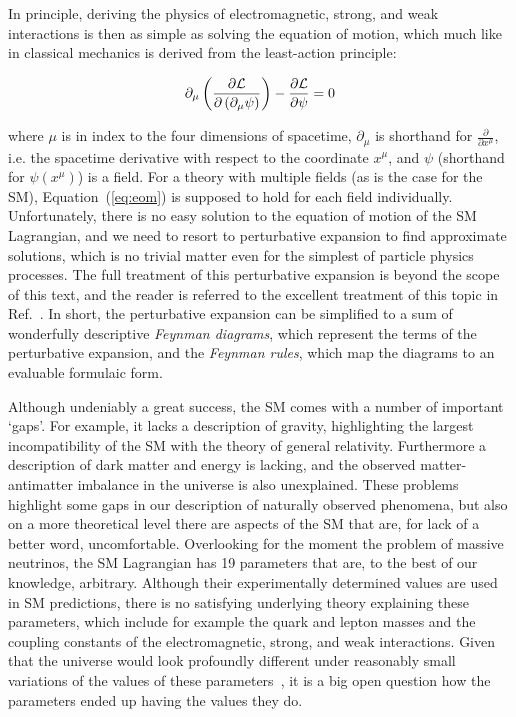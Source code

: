 In principle, deriving the physics of electromagnetic, strong, and weak interactions is then as simple as solving the equation of motion, which much like in classical mechanics is derived from the least-action principle:
% 
\begin{linenomath*}
\begin{equation}
\label{eq:eom}
\partial_\mu \left(
    \frac{
        \partial \mathcal{L}
        }{
        \partial \left( \partial_\mu \psi \right)
        }
    \right)
    -
    \frac{\partial\mathcal{L}}{\partial\psi}
    = 0
\end{equation}
\end{linenomath*}
% 
where $\mu$ is in index to the four dimensions of spacetime, $\partial_\mu$ is shorthand for $\frac{\partial}{\partial x^\mu}$, i.e. the spacetime derivative with respect to the coordinate $x^\mu$, and $\psi$ (shorthand for $\psi(x^\mu)$) is a field.
% 
For a theory with multiple fields (as is the case for the SM), Equation~(\ref{eq:eom}) is supposed to hold for each field individually.
% 
Unfortunately, there is no easy solution to the equation of motion of the SM Lagrangian, and we need to resort to perturbative expansion to find approximate solutions, which is no trivial matter even for the simplest of particle physics processes.
% 
The full treatment of this perturbative expansion is beyond the scope of this text, and the reader is referred to the excellent treatment of this topic in Ref.~\cite{peskin}.
% 
In short, the perturbative expansion can be simplified to a sum of wonderfully descriptive \textit{Feynman diagrams}, which represent the terms of the perturbative expansion, and the \textit{Feynman rules}, which map the diagrams to an evaluable formulaic form.


Although undeniably a great success, the SM comes with a number of important `gaps'.
% 
For example, it lacks a description of gravity, highlighting the largest incompatibility of the SM with the theory of general relativity.
% 
Furthermore a description of dark matter and energy is lacking, and the observed matter-antimatter imbalance in the universe is also unexplained.
% 
These problems highlight some gaps in our description of naturally observed phenomena, but also on a more theoretical level there are aspects of the SM that are, for lack of a better word, uncomfortable.
% 
Overlooking for the moment the problem of massive neutrinos, the SM Lagrangian has 19 parameters that are, to the best of our knowledge, arbitrary.
% 
Although their experimentally determined values are used in SM predictions, there is no satisfying underlying theory explaining these parameters, which include for example the quark and lepton masses and the coupling constants of the electromagnetic, strong, and weak interactions.
% 
Given that the universe would look profoundly different under reasonably small variations of the values of these parameters~\cite{Cahn:1996ag}, it is a big open question how the parameters ended up having the values they do.
% 


